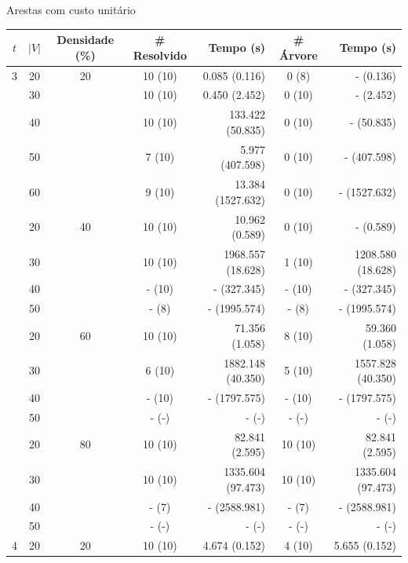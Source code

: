 \documentclass[dvipsnames]{beamer}
\newcommand\Fontvi{\fontsize{5}{6.2}\selectfont}
\begin{document}
\begin{frame}{Arestas com custo unitário}
  \tiny{
    \Fontvi
\begin{table}
\begin{tabular}{|c|c|c|c|r|c|r|}\hline

{$t$} & {$|V|$} & {Densidade (\%)} & {\# Resolvido } & {Tempo (s)}  &{\# Árvore}  &{Tempo (s)} 
\\ \hline\hline

3 & 20 & 20 & 10 (10) & 0.085 (0.116) & 0 (8) & - (0.136) \\ 
 & 30 & & 10 (10) & 0.450 (2.452) & 0 (10) & - (2.452) \\ 
 & 40 & & 10 (10) & 133.422 (50.835) & 0 (10) & - (50.835) \\ 
 & 50 & & 7 (10) & 5.977 (407.598) & 0 (10) & - (407.598) \\ 
 & 60 & & 9 (10) & 13.384 (1527.632) & 0 (10) & - (1527.632) \\ 
 & 20 & 40 & 10 (10) & 10.962 (0.589) & 0 (10) & - (0.589) \\ 
 & 30 & & 10 (10) & 1968.557 (18.628) & 1 (10) & 1208.580 (18.628) \\ 
 & 40 & & - (10) & - (327.345) & - (10) & - (327.345) \\ 
 \rowcolor[rgb]{1,1,0}& 50 & & - (8) & - (1995.574) & - (8) & - (1995.574) \\ 
 & 20 & 60 & 10 (10) & 71.356 (1.058) & 8 (10) & 59.360 (1.058) \\ 
 & 30 & & 6 (10) & 1882.148 (40.350) & 5 (10) & 1557.828 (40.350) \\ 
 & 40 & & - (10) & - (1797.575) & - (10) & - (1797.575) \\ 
 & 50 & & - (-) & - (-) & - (-) & - (-) \\ 
 & 20 & 80 & 10 (10) & 82.841 (2.595) & 10 (10) & 82.841 (2.595) \\ 
 & 30 & & 10 (10) & 1335.604 (97.473) & 10 (10) & 1335.604 (97.473) \\ 
 & 40 & & - (7) & - (2588.981) & - (7) & - (2588.981) \\ 
 & 50 & & - (-) & - (-) & - (-) & - (-) \\ 
4 & 20 & 20 & 10 (10) & 4.674 (0.152) & 4 (10) & 5.655 (0.152) \\ 

\end{tabular}
\end{table}}
\end{frame}
\end{document}
